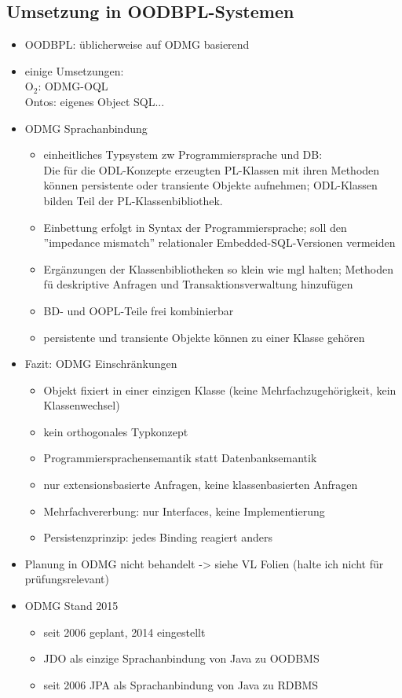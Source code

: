 \subsection{Umsetzung in OODBPL-Systemen}
\begin{itemize}
	\item OODBPL: üblicherweise auf ODMG basierend
	\item einige Umsetzungen:\\
	O$_2$: ODMG-OQL\\
	Ontos: eigenes Object SQL...
	
	\item ODMG Sprachanbindung
	\begin{itemize}
		\item einheitliches Typsystem zw Programmiersprache und DB:\\
		Die für die ODL-Konzepte erzeugten PL-Klassen mit ihren Methoden können persistente oder transiente Objekte aufnehmen; ODL-Klassen bilden Teil der PL-Klassenbibliothek.
		\item Einbettung erfolgt in Syntax der Programmiersprache; soll den ''impedance mismatch'' relationaler Embedded-SQL-Versionen vermeiden
		\item Ergänzungen der Klassenbibliotheken so klein wie mgl halten; Methoden fü deskriptive Anfragen und Transaktionsverwaltung hinzufügen
		\item BD- und OOPL-Teile frei kombinierbar
		\item persistente und transiente Objekte können zu einer Klasse gehören
	\end{itemize}
	
	\item Fazit: ODMG Einschränkungen\label{odmg_constraints}
	\begin{itemize}
		\item Objekt fixiert in einer einzigen Klasse (keine Mehrfachzugehörigkeit, kein Klassenwechsel)
		\item kein orthogonales Typkonzept
		\item Programmiersprachensemantik statt Datenbanksemantik
		\item nur extensionsbasierte Anfragen, keine klassenbasierten Anfragen
		\item Mehrfachvererbung: nur Interfaces, keine Implementierung
		\item Persistenzprinzip: jedes Binding reagiert anders
	\end{itemize}
	
	\item Planung in ODMG nicht behandelt -> siehe VL Folien (halte ich nicht für prüfungsrelevant)
	\item ODMG Stand 2015
	\begin{itemize}
		\item seit 2006 geplant, 2014 eingestellt
		\item JDO als einzige Sprachanbindung von Java zu OODBMS
		\item seit 2006 JPA als Sprachanbindung von Java zu RDBMS 
	\end{itemize}
\end{itemize}